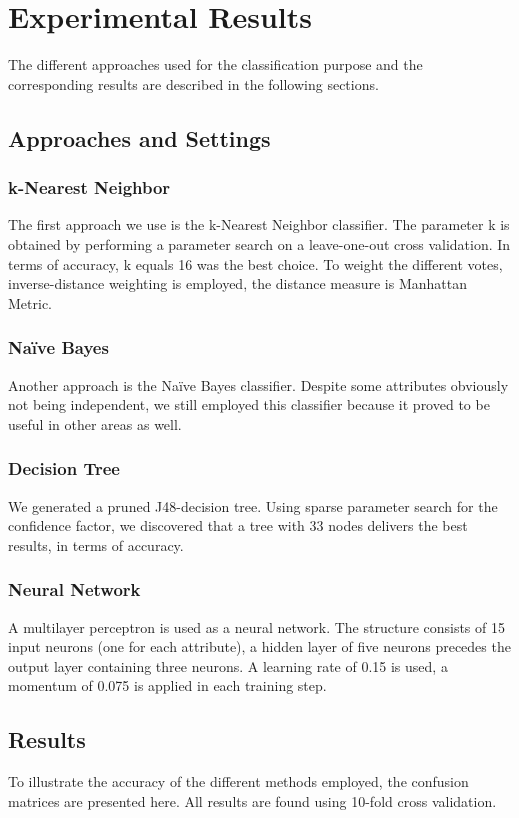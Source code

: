 \section{Experimental Results}
The different approaches used for the classification purpose and the corresponding results are described in the following sections. 
\subsection{Approaches and Settings}

\subsubsection*{k-Nearest Neighbor}
The first approach we use is the k-Nearest Neighbor classifier. The parameter k is obtained by performing a parameter search on a leave-one-out cross validation. In terms of accuracy, k equals 16 was the best choice. To weight the different votes, inverse-distance weighting is employed, the distance measure is Manhattan Metric. 

\subsubsection*{Na\"ive Bayes}
Another approach is the Na\"ive Bayes classifier. Despite some attributes obviously not being independent, we still employed this classifier because it proved to be useful in other areas as well.  

\subsubsection*{Decision Tree}
We generated a pruned J48-decision tree. Using sparse parameter search for the confidence factor, we discovered that a tree with 33 nodes delivers the best results, in terms of accuracy.

\subsubsection{Neural Network}
A multilayer perceptron is used as a neural network. The structure consists of 15 input neurons (one for each attribute), a hidden layer of five neurons precedes the output layer containing three neurons. A learning rate of 0.15 is used, a momentum of 0.075 is applied in each training step. 

\subsection{Results}
To illustrate the accuracy of the different methods employed, the confusion matrices are presented here. All results are found using 10-fold cross validation.

